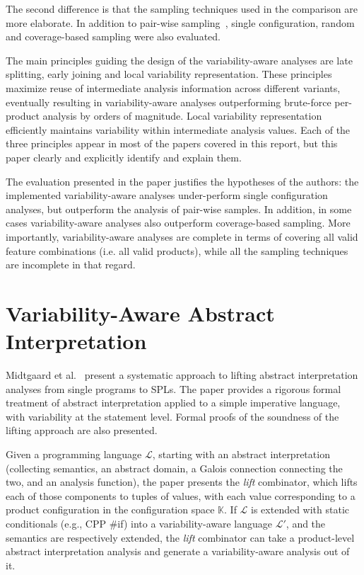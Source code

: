 \documentclass[11pt]{article}
\newcommand{\term}[1] {\emph{#1}}
\begin{document}
The second difference is that the sampling techniques used in the comparison are more elaborate. In addition to pair-wise sampling~\cite{Apel:2013}, single configuration, random and coverage-based sampling were also evaluated.

The main principles guiding the design of the variability-aware analyses are late splitting, early joining and local variability representation. These principles maximize reuse of intermediate analysis information across different variants, eventually resulting in variability-aware analyses outperforming brute-force per-product analysis by orders of magnitude. Local variability representation efficiently maintains variability within intermediate analysis values. Each of the three principles appear in most of the papers covered in this report, but this paper clearly and explicitly identify and explain them.

The evaluation presented in the paper justifies the hypotheses of the authors: the implemented variability-aware analyses under-perform single configuration analyses, but outperform the analysis of pair-wise samples. In addition, in some cases variability-aware analyses also outperform coverage-based sampling. More importantly, variability-aware analyses are complete in terms of covering all valid feature combinations (i.e. all valid products), while all the sampling techniques are incomplete in that regard.

\section{Variability-Aware Abstract Interpretation}

\newcommand{\configSpace}{\mathbb{K}}
\newcommand{\featSpace}{\mathbb{F}}
\newcommand{\lang}{\mathcal{L}}

Midtgaard et al.~\cite{Midtgaard:2015} present a systematic approach to lifting abstract interpretation analyses from single programs to SPLs. The paper provides a rigorous formal treatment of abstract interpretation applied to a simple imperative language, with variability at the statement level. Formal proofs of the soundness of the lifting approach are also presented. 

Given a programming language $\lang$, starting with an abstract interpretation (collecting semantics, an abstract domain, a Galois connection connecting the two, and an analysis function), the paper presents the \term{lift} combinator, which lifts each of those components to tuples of values, with each value corresponding to a product configuration in the configuration space $\configSpace$. If $\lang$ is extended with static conditionals (e.g., CPP \#if) into a variability-aware language  $\lang'$, and the semantics are respectively extended, the \term{lift} combinator can take a product-level abstract interpretation analysis and generate a variability-aware analysis out of it. 
\end{document}
